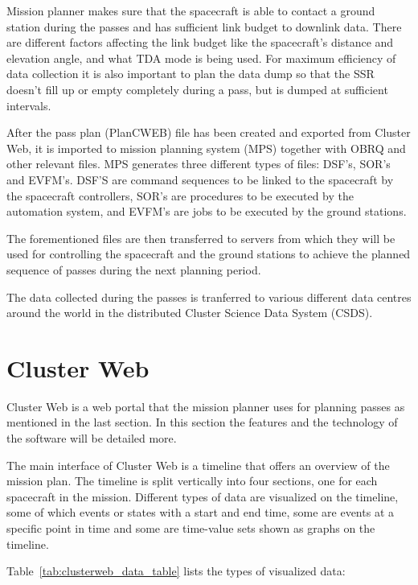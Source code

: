 Mission planner makes sure that the spacecraft is able to contact a ground station during the passes and has sufficient link budget to downlink data. There are different factors affecting the link budget like the spacecraft's distance and elevation angle, and what TDA mode is being used. For maximum efficiency of data collection it is also important to plan the data dump so that the SSR doesn't fill up or empty completely during a pass, but is dumped at sufficient intervals.

After the pass plan (PlanCWEB) file has been created and exported from Cluster Web, it is imported to mission planning system (MPS) together with OBRQ and other relevant files. MPS generates three different types of files: DSF's, SOR's and EVFM's. DSF'S are command sequences to be linked to the spacecraft  by the spacecraft controllers, SOR's are procedures to be executed by the automation system, and EVFM's are jobs to be executed by the ground stations.

The forementioned files are then transferred to servers from which they will be used for controlling the spacecraft and the ground stations to achieve the planned sequence of passes during the next planning period.

The data collected during the passes is tranferred to various different data centres around the world in the distributed Cluster Science Data System (CSDS).

\section{Cluster Web}
Cluster Web is a web portal that the mission planner uses for planning passes as mentioned in the last section. In this section the features and the technology of the software will be detailed more.

The main interface of Cluster Web is a timeline that offers an overview of the mission plan. The timeline is split vertically into four sections, one for each spacecraft in the mission. Different types of data are visualized on the timeline, some of which events or states with a start and end time, some are events at a specific point in time and some are time-value sets shown as graphs on the timeline.

Table~\ref{tab:clusterweb_data_table} lists the types of visualized data:

